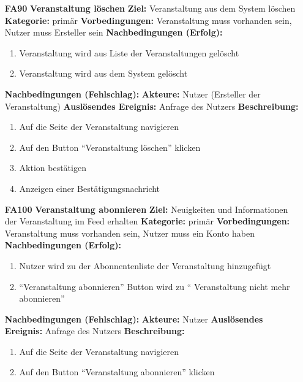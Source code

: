 \documentclass[parskip=full]{scrartcl}
\begin{document}
\begin{itemize}[nosep]
		\item[\textbf{FA90}]\textbf{Veranstaltung löschen}
		\newline \textbf{Ziel:} Veranstaltung aus dem System löschen
		\newline \textbf{Kategorie:} primär
		\newline \textbf{Vorbedingungen:} Veranstaltung muss vorhanden sein, Nutzer muss Ersteller sein
		\newline \textbf{Nachbedingungen (Erfolg):}
		\begin{enumerate}[nosep]
			\item Veranstaltung wird aus Liste der Veranstaltungen gelöscht
			\item Veranstaltung wird aus dem System gelöscht
		\end{enumerate}
		\textbf{Nachbedingungen (Fehlschlag):}
		\newline \textbf{Akteure:}  Nutzer (Ersteller der Veranstaltung)
		\newline \textbf{Auslösendes Ereignis:} Anfrage des Nutzers
		\newline \textbf{Beschreibung:}
		\begin{enumerate}[nosep]
			\item Auf die Seite der Veranstaltung navigieren
			\item Auf den Button “Veranstaltung löschen” klicken
			\item Aktion bestätigen
			\item Anzeigen einer Bestätigungsnachricht\\
		\end{enumerate}

		\item[\textbf{FA100}]\textbf{Veranstaltung abonnieren}
		\newline \textbf{Ziel:} Neuigkeiten und Informationen der Veranstaltung im Feed erhalten
		\newline \textbf{Kategorie:} primär
		\newline \textbf{Vorbedingungen:} Veranstaltung muss vorhanden sein, Nutzer muss ein Konto haben
		\newline \textbf{Nachbedingungen (Erfolg):}
		\begin{enumerate}[nosep]
			\item Nutzer wird zu der Abonnentenliste der Veranstaltung hinzugefügt
			\item “Veranstaltung abonnieren” Button wird zu “ Veranstaltung nicht mehr abonnieren”
		\end{enumerate}
		\textbf{Nachbedingungen (Fehlschlag):}
		\newline \textbf{Akteure:} Nutzer
		\newline \textbf{Auslösendes Ereignis:} Anfrage des Nutzers
		\newline \textbf{Beschreibung:}
		\begin{enumerate}[nosep]
			\item Auf die Seite der Veranstaltung navigieren
			\item Auf den Button “Veranstaltung abonnieren” klicken\\
		\end{enumerate}



\end{itemize}
\end{document}
